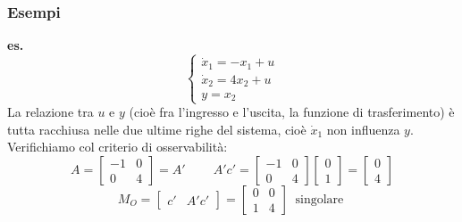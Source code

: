 \subsubsection{Esempi}
\textbf{es.} 
\[
    \begin{cases}
        \dot{x}_1 = -x_1 + u \\
        \dot{x}_2 = 4x_2 +u\\
        y=x_2
    \end{cases}
\]
La relazione tra $u$ e $y$ (cioè fra l'ingresso e l'uscita, la funzione di trasferimento) è tutta racchiusa nelle due ultime righe del sistema, cioè $\dot{x}_1$ non influenza $y$.\newline
Verifichiamo col criterio di osservabilità:\newline
\[
    A= \left[\begin{matrix}
        -1 & 0 \\ 0 & 4
    \end{matrix}\right] = A' \;\;\;\;\;\;\;\; A'c' = \left[\begin{matrix}
        -1 &0 \\ 0 & 4
    \end{matrix}\right] \left[\begin{matrix}
        0 \\ 1
    \end{matrix}\right] = \left[\begin{matrix}
        0 \\ 4
    \end{matrix}\right]
\]
\[
    M_O = \left[\begin{matrix}
        c' & A' c'
    \end{matrix}\right] = \left[\begin{matrix}
        0 & 0 \\ 1 & 4
    \end{matrix}\right] \;\;\text{singolare}\;
\]
